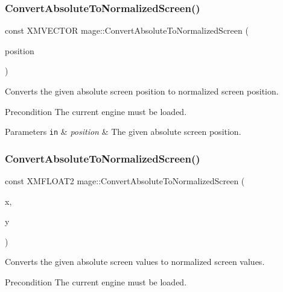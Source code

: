 \subsubsection{\texorpdfstring{Convert\+Absolute\+To\+Normalized\+Screen()}{ConvertAbsoluteToNormalizedScreen()}\hspace{0.1cm}{\footnotesize\ttfamily [1/3]}}
{\footnotesize\ttfamily const X\+M\+V\+E\+C\+T\+OR mage\+::\+Convert\+Absolute\+To\+Normalized\+Screen (\begin{DoxyParamCaption}\item[{const X\+M\+V\+E\+C\+T\+OR \&}]{position }\end{DoxyParamCaption})}

Converts the given absolute screen position to normalized screen position.

\begin{DoxyPrecond}{Precondition}
The current engine must be loaded. 
\end{DoxyPrecond}

\begin{DoxyParams}[1]{Parameters}
\mbox{\tt in}  & {\em position} & The given absolute screen position. \\
\hline
\end{DoxyParams}
\hypertarget{namespacemage_a98a82c6ca513d50f16d4ee6256fdac29}{}\label{namespacemage_a98a82c6ca513d50f16d4ee6256fdac29} 
\subsubsection{\texorpdfstring{Convert\+Absolute\+To\+Normalized\+Screen()}{ConvertAbsoluteToNormalizedScreen()}\hspace{0.1cm}{\footnotesize\ttfamily [2/3]}}
{\footnotesize\ttfamily const X\+M\+F\+L\+O\+A\+T2 mage\+::\+Convert\+Absolute\+To\+Normalized\+Screen (\begin{DoxyParamCaption}\item[{float}]{x,  }\item[{float}]{y }\end{DoxyParamCaption})}

Converts the given absolute screen values to normalized screen values.

\begin{DoxyPrecond}{Precondition}
The current engine must be loaded. 
\end{DoxyPrecond}

